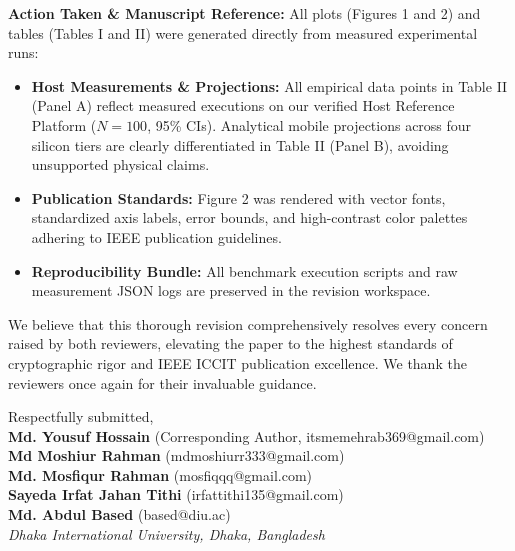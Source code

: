 \documentclass[11pt,a4paper]{article}
\begin{document}
\begin{responsebox}
\textbf{Action Taken \& Manuscript Reference:} All plots (Figures 1 and 2) and tables (Tables I and II) were generated directly from measured experimental runs:
\begin{itemize}[itemsep=2pt]
    \item \textbf{Host Measurements \& Projections:} All empirical data points in Table II (Panel A) reflect measured executions on our verified Host Reference Platform ($N=100$, 95\% CIs). Analytical mobile projections across four silicon tiers are clearly differentiated in Table II (Panel B), avoiding unsupported physical claims.
    \item \textbf{Publication Standards:} Figure 2 was rendered with vector fonts, standardized axis labels, error bounds, and high-contrast color palettes adhering to IEEE publication guidelines.
    \item \textbf{Reproducibility Bundle:} All benchmark execution scripts and raw measurement JSON logs are preserved in the revision workspace.
\end{itemize}
\end{responsebox}

\vspace{1.5em}
\noindent We believe that this thorough revision comprehensively resolves every concern raised by both reviewers, elevating the paper to the highest standards of cryptographic rigor and IEEE ICCIT publication excellence. We thank the reviewers once again for their invaluable guidance.

\vspace{1.5em}
\noindent Respectfully submitted,\\[1ex]
\textbf{Md. Yousuf Hossain} (Corresponding Author, itsmemehrab369@gmail.com)\\
\textbf{Md Moshiur Rahman} (mdmoshiurr333@gmail.com)\\
\textbf{Md. Mosfiqur Rahman} (mosfiqqq@gmail.com)\\
\textbf{Sayeda Irfat Jahan Tithi} (irfattithi135@gmail.com)\\
\textbf{Md. Abdul Based} (based@diu.ac)\\[1ex]
\emph{Dhaka International University, Dhaka, Bangladesh}

\vspace{2em}


\end{document}
